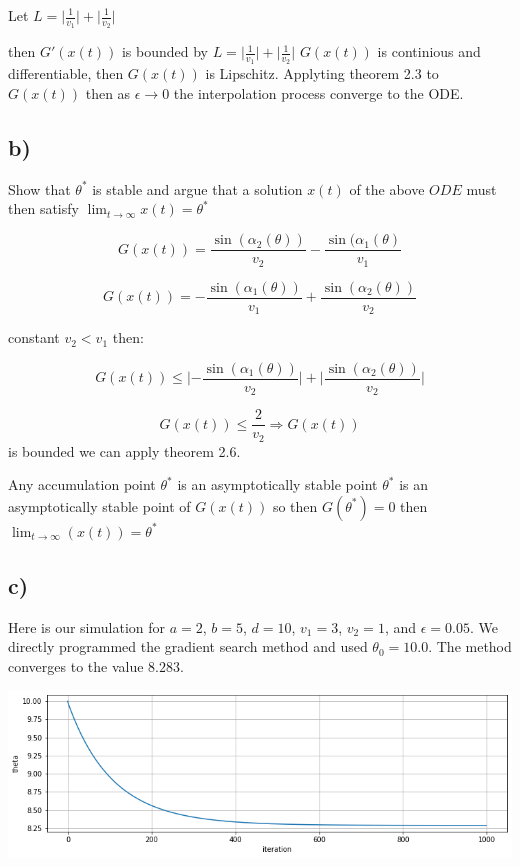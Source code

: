 \documentclass{article}
\begin{document}
Let $L = \lvert\frac{1}{v_1}\rvert + \lvert\frac{1}{v_2}\rvert$

then $G'(x(t))$ is bounded by $L = \lvert\frac{1}{v_1}\rvert + \lvert\frac{1}{v_2}\rvert$ \since $G(x(t))$ is continious and differentiable, then $G(x(t))$ is Lipschitz. Applyting theorem 2.3 to $G(x(t))$ then as $\epsilon \rightarrow 0$ the interpolation process converge to the ODE.

\subsection{b)}

Show that $\theta^{*}$ is stable and argue that a solution $x(t)$ of the above $ODE$ must then satisfy $\lim_{t\rightarrow\infty}x(t)=\theta^{*}$

$$G(x(t))=\frac{\sin(\alpha_{2}(\theta))}{v_{2}}-\frac{\sin(\alpha_{1}(\theta)}{v_{1}}$$

$$G(x(t)) = -\frac{\sin(\alpha_{1}(\theta))}{v_{1}} + \frac{\sin(\alpha_{2}(\theta))}{v_{2}}$$

constant $v_{2} < v_{1}$ then:

$$G(x(t)) \leq \lvert -\frac{\sin(\alpha_{1}(\theta))}{v_{2}}\rvert + \lvert\frac{\sin(\alpha_{2}(\theta))}{v_{2}}\rvert$$

$$G(x(t)) \leq \frac{2}{v_{2}} \Rightarrow G(x(t))$$ is bounded we can apply theorem 2.6. 

Any accumulation point $\theta^{*}$ is an asymptotically stable point $\theta^{*}$ is an asymptotically stable point of $G(x(t))$ so then $G(\theta^{*})=0$ then $\lim_{t\rightarrow\infty}(x(t))=\theta^{*}$


\subsection{c)}

Here is our simulation for $a=2$, $b=5$, $d=10$, $v_{1}=3$, $v_{2}=1$, and $\epsilon=0.05$. We directly programmed the gradient search method and used $\theta_{0}=10.0$. The method converges to the value $8.283$.

\includegraphics[width=0.9\linewidth]{index.png}
\end{document}
